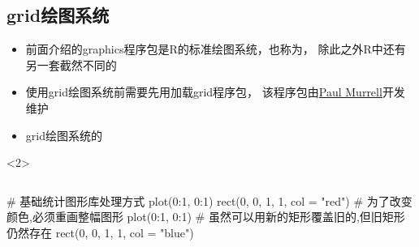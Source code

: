 \subsection{grid绘图系统}
\begin{frame}[t,fragile]{\subsecname}{}
\begin{itemize}
\item<1-> 前面介绍的graphics程序包是R的标准绘图系统，也称为，
  除此之外R中还有另一套截然不同的
\item<1-> 使用grid绘图系统前需要先用加载grid程序包，
该程序包由\href{https://www.stat.auckland.ac.nz/~paul/}{\uline{Paul Murrell}}开发维护
\item<2-> grid绘图系统的
\end{itemize}

\vspace{-10pt}

\begin{overlayarea}{\textwidth}{\textheight}


\begin{onlyenv}<2>
\begin{columns}
  \begin{column}[t]{.5\textwidth}
    \begin{rcode}
# 基础统计图形库处理方式
plot(0:1, 0:1)
rect(0, 0, 1, 1, col = "red")
# 为了改变颜色,必须重画整幅图形
plot(0:1, 0:1)
# 虽然可以用新的矩形覆盖旧的,但旧矩形仍然存在
rect(0, 0, 1, 1, col = "blue")
    \end{rcode} 
  \end{column}


\end{columns}
\end{onlyenv}
\end{overlayarea}
\end{frame}
